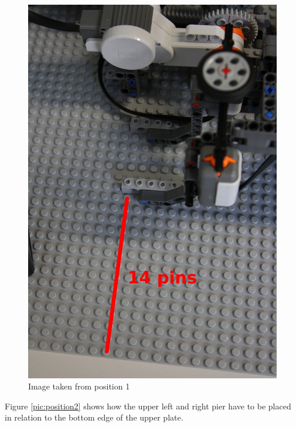 \documentclass[%
  a4paper,%
  11pt,%
  blue,%
  hyperref	%
  ]{tubsartcl}
\begin{document}
\begin{figure}[!htb]
\begin{center}
\includegraphics[scale=0.35]{graphics_lego/position1.jpg}
\end{center}
\caption{Image taken from position 1}
\label{pic:position1}
\end{figure}

\clearpage

Figure \ref{pic:position2} shows how the upper left and right pier have to be placed in relation to the bottom edge of the upper plate.
\end{document}
